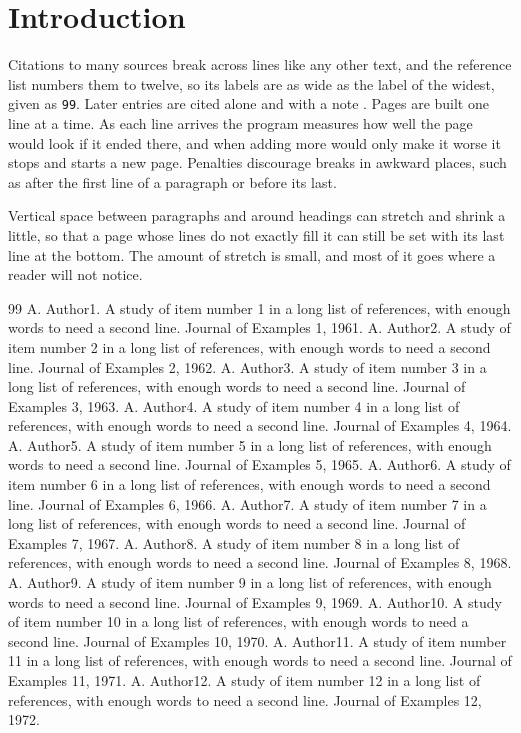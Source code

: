\documentclass{article}
\begin{document}
\section{Introduction}
Citations to many sources \cite{s1,s2,s3,s4,s5,s6,s7,s8,s9,s10,s11,s12} break across lines
like any other text, and the reference list numbers them to twelve, so its labels are as wide as
the label of the widest, given as \texttt{99}. Later entries are cited alone \cite{s11} and with a
note \cite[remark]{s12}.
Pages are built one line at a time. As each line arrives the program measures how well the page would look if it ended there, and when adding more would only make it worse it stops and starts a new page. Penalties discourage breaks in awkward places, such as after the first line of a paragraph or before its last.

Vertical space between paragraphs and around headings can stretch and shrink a little, so that a page whose lines do not exactly fill it can still be set with its last line at the bottom. The amount of stretch is small, and most of it goes where a reader will not notice.
\begin{thebibliography}{99}
 A. Author1. A study of item number 1 in a long list of references, with enough words to need a second line. Journal of Examples 1, 1961.
 A. Author2. A study of item number 2 in a long list of references, with enough words to need a second line. Journal of Examples 2, 1962.
 A. Author3. A study of item number 3 in a long list of references, with enough words to need a second line. Journal of Examples 3, 1963.
 A. Author4. A study of item number 4 in a long list of references, with enough words to need a second line. Journal of Examples 4, 1964.
 A. Author5. A study of item number 5 in a long list of references, with enough words to need a second line. Journal of Examples 5, 1965.
 A. Author6. A study of item number 6 in a long list of references, with enough words to need a second line. Journal of Examples 6, 1966.
 A. Author7. A study of item number 7 in a long list of references, with enough words to need a second line. Journal of Examples 7, 1967.
 A. Author8. A study of item number 8 in a long list of references, with enough words to need a second line. Journal of Examples 8, 1968.
 A. Author9. A study of item number 9 in a long list of references, with enough words to need a second line. Journal of Examples 9, 1969.
 A. Author10. A study of item number 10 in a long list of references, with enough words to need a second line. Journal of Examples 10, 1970.
 A. Author11. A study of item number 11 in a long list of references, with enough words to need a second line. Journal of Examples 11, 1971.
 A. Author12. A study of item number 12 in a long list of references, with enough words to need a second line. Journal of Examples 12, 1972.
\end{thebibliography}
\end{document}
